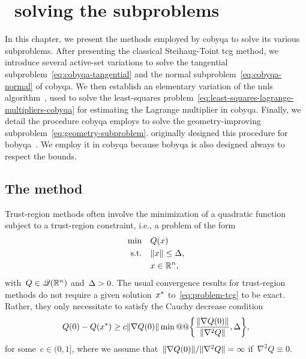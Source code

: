 %
%
%
\chapter{ \textemdash\ solving the subproblems}
\label{ch:cobyqa-subproblems}

In this chapter, we present the methods employed by \gls{cobyqa} to solve its various subproblems.
After presenting the classical Steihaug-Toint \gls{tcg} method, we introduce several active-set variations to solve the tangential subproblem~\cref{eq:cobyqa-tangential} and the normal subproblem~\cref{eq:cobyqa-normal} of \gls{cobyqa}.
We then establish an elementary variation of the \gls{nnls} algorithm~\cite[Alg.~(23.10)]{Lawson_Hanson_1987}, used to solve the least-squares problem~\cref{eq:least-squares-lagrange-multipliers-cobyqa} for estimating the Lagrange multiplier in \gls{cobyqa}.
Finally, we detail the procedure \gls{cobyqa} employs to solve the geometry-improving subproblem~\cref{eq:geometry-subproblem}.
 originally designed this procedure for \gls{bobyqa}~\cite{Powell_2009}.
We employ it in \gls{cobyqa} because \gls{bobyqa} is also designed always to respect the bounds.

\section{The  method}

Trust-region methods often involve the minimization of a quadratic function subject to a trust-region constraint, i.e., a problem of the form
\begin{subequations}
    \label{eq:problem-tcg}
    \begin{align}
        \min        & \quad Q(\iter)\\
        \text{s.t.} & \quad \norm{\iter} \le \rad,\\
                    & \quad \iter \in \R^n, \nonumber
    \end{align}
\end{subequations}
with~$Q \in \mathscr{Q}(\mathbb{R}^n)$ and~$\rad > 0$.
The usual convergence results for trust-region methods do not require a given solution~$\iter[\ast]$ to~\cref{eq:problem-tcg} to be exact.
Rather, they only necessitate to satisfy the Cauchy decrease condition
\begin{equation*}
    Q(0) - Q(\iter[\ast]) \ge c \norm{\nabla Q(0)} \min @@ \set[\bigg]{\frac{\norm{\nabla Q(0)}}{\norm{\nabla^2 Q}}, \rad},
\end{equation*}
for some~$c \in (0, 1]$, where we assume that~$\lVert\nabla Q(0)\rVert / \lVert\nabla^2 Q\rVert = \infty$ if~$\nabla^2 Q \equiv 0$.

